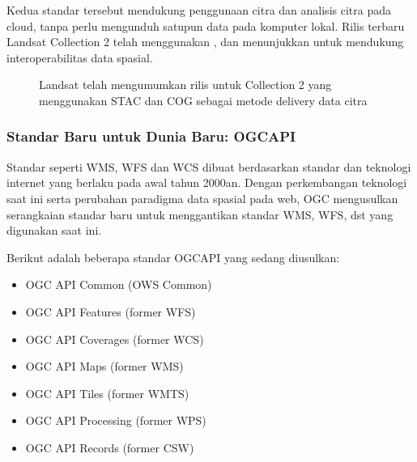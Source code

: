 \documentclass[letterpaper,10pt,english]{sphinxmanual}
\let\sphinxpxdimen\pdfpxdimen\else\newdimen\sphinxpxdimen
\begin{document}
Kedua standar tersebut mendukung penggunaan citra dan analisis citra pada cloud, tanpa perlu mengunduh satupun data pada komputer lokal. Rilis terbaru Landsat Collection 2 telah menggunakan , dan menunjukkan  untuk mendukung interoperabilitas data spasial.

\begin{figure}[htbp]
\centering
\capstart

\noindent\sphinxincludegraphics[height=300\sphinxpxdimen]{{2020-12-04-04-33-50}.png}
\caption{Landsat telah mengumumkan rilis untuk Collection 2 yang menggunakan STAC dan COG sebagai metode delivery data citra}\label{\detokenize{sesi3/interoperabilitas:landsatcol2}}\end{figure}


\subsubsection{Standar Baru untuk Dunia Baru: OGC\sphinxhyphen{}API}
\label{\detokenize{sesi3/interoperabilitas:standar-baru-untuk-dunia-baru-ogc-api}}
Standar seperti WMS, WFS dan WCS dibuat berdasarkan standar dan teknologi internet yang berlaku pada awal tahun 2000an. Dengan perkembangan teknologi saat ini serta perubahan paradigma data spasial pada web, OGC mengusulkan serangkaian standar baru untuk menggantikan standar WMS, WFS, dst yang digunakan saat ini.

Berikut adalah beberapa standar OGC\sphinxhyphen{}API yang sedang diusulkan:
\begin{itemize}
\item {} 
OGC API \sphinxhyphen{} Common (OWS Common)

\item {} 
OGC API \sphinxhyphen{} Features (former WFS)

\item {} 
OGC API \sphinxhyphen{} Coverages (former WCS)

\item {} 
OGC API \sphinxhyphen{} Maps (former WMS)

\item {} 
OGC API \sphinxhyphen{} Tiles (former WMTS)

\item {} 
OGC API \sphinxhyphen{} Processing (former WPS)

\item {} 
OGC API \sphinxhyphen{} Records (former CSW)

\end{itemize}
\end{document}
